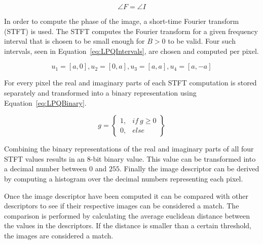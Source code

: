 \begin{equation}
  \angle F = \angle I
\label{eq:PSFFTFinal}
\end{equation}

In order to compute the phase of the image, a short-time Fourier transform (STFT) is used. The STFT computes the Fourier transform for a given frequency interval that is chosen to be small enough for \(B > 0\) to be valid. Four such intervals, seen in Equation~\ref{eq:LPQIntervals}, are chosen and computed per pixel.

\begin{equation}
  u_{1} = \left [ a, 0 \right ], u_{2} = \left [ 0, a \right ], u_{3} = \left [ a, a \right ], u_{4} = \left [ a, -a \right ]
\label{eq:LPQIntervals}
\end{equation}

For every pixel the real and imaginary parts of each STFT computation is stored separately and transformed into a binary representation using Equation~\ref{eq:LPQBinary}.

\begin{equation}
  g = \begin{Bmatrix}
   1, & if\ g \geq 0\\
   0, & else
  \end{Bmatrix}
\label{eq:LPQBinary}
\end{equation}

Combining the binary representations of the real and imaginary parts of all four STFT values results in an 8-bit binary value. This value can be transformed into a decimal number between \(0\) and \(255\). Finally the image descriptor can be derived by computing a histogram over the decimal numbers representing each pixel.

Once the image descriptor have been computed it can be compared with other descriptors to see if their respective images can be considered a match. The comparison is performed by calculating the average euclidean distance between the values in the descriptors. If the distance is smaller than a certain threshold, the images are considered a match.
